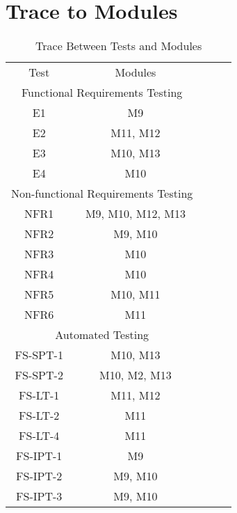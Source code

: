 \documentclass[12pt, titlepage]{article}
\begin{document}
		
	
\section{Trace to Modules}		

\begin{table}[H]
\centering
\begin{tabular}{|cc|lll}
\cline{1-2}
\multicolumn{1}{|c|}{Test} & Modules & \multicolumn{1}{c}{} & \multicolumn{1}{c}{} &  \\ \cline{1-2}
\multicolumn{2}{|c|}{Functional Requirements Testing} &  &  &  \\ \cline{1-2}
\multicolumn{1}{|c|}{E1} & M9 &  &  &  \\ \cline{1-2}
\multicolumn{1}{|c|}{E2} & M11, M12 &  &  &  \\ \cline{1-2}
\multicolumn{1}{|c|}{E3} & M10, M13 &  &  &  \\ \cline{1-2}
\multicolumn{1}{|c|}{E4} & M10 &  &  &  \\ \cline{1-2}

\multicolumn{2}{|c|}{Non-functional Requirements Testing} &  &  &  \\ \cline{1-2}
\multicolumn{1}{|c|}{NFR1} & M9, M10, M12, M13 &  &  &  \\ \cline{1-2}
\multicolumn{1}{|c|}{NFR2} & M9, M10 &  &  &  \\ \cline{1-2}
\multicolumn{1}{|c|}{NFR3} & M10 &  &  &  \\ \cline{1-2}
\multicolumn{1}{|c|}{NFR4} & M10 &  &  &  \\ \cline{1-2}
\multicolumn{1}{|c|}{NFR5} & M10, M11 &  &  &  \\ \cline{1-2}
\multicolumn{1}{|c|}{NFR6} & M11 &  &  &  \\ \cline{1-2}

\multicolumn{2}{|c|}{Automated Testing} &  &  &  \\ \cline{1-2}
\multicolumn{1}{|c|}{FS-SPT-1} & M10, M13 &  &  &  \\ \cline{1-2}
\multicolumn{1}{|c|}{FS-SPT-2} & M10, M2, M13&  &  &  \\ \cline{1-2}
\multicolumn{1}{|c|}{FS-LT-1} & M11, M12 &  &  &  \\ \cline{1-2}
\multicolumn{1}{|c|}{FS-LT-2} & M11 &  &  &  \\ \cline{1-2}
\multicolumn{1}{|c|}{FS-LT-4} & M11 &  &  &  \\ \cline{1-2}
\multicolumn{1}{|c|}{FS-IPT-1} & M9 &  &  &  \\ \cline{1-2}
\multicolumn{1}{|c|}{FS-IPT-2} & M9, M10 &  &  &  \\ \cline{1-2}
\multicolumn{1}{|c|}{FS-IPT-3} & M9, M10 &  &  &  \\ \cline{1-2}

\end{tabular}
\caption{Trace Between Tests and Modules}
\label{tab:my-table}
\end{table}	
		
\end{document}
